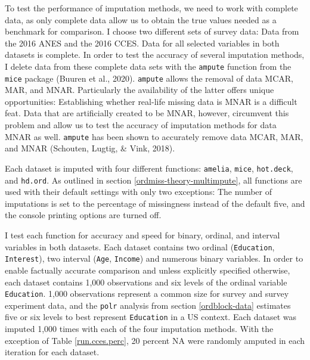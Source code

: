 \documentclass[12pt,econ]{sources/authesis}
\begin{document}
To test the performance of imputation methods, we need to work with complete data, as only complete data allow us to obtain the true values needed as a benchmark for comparison. I choose two different sets of survey data: Data from the 2016 ANES and the 2016 CCES. Data for all selected variables in both datasets is complete. In order to test the accuracy of several imputation methods, I delete data from these complete data sets with the \texttt{ampute} function from the \texttt{mice} package (Buuren et al., 2020). \texttt{ampute} allows the removal of data MCAR, MAR, and MNAR. Particularly the availability of the latter offers unique opportunities: Establishing whether real-life missing data is MNAR is a difficult feat. Data that are artificially created to be MNAR, however, circumvent this problem and allow us to test the accuracy of imputation methods for data MNAR as well. \texttt{ampute} has been shown to accurately remove data MCAR, MAR, and MNAR (Schouten, Lugtig, \& Vink, 2018).

Each dataset is imputed with four different functions: \texttt{amelia}, \texttt{mice}, \texttt{hot.deck}, and \texttt{hd.ord}. As outlined in section \ref{ordmiss-theory-multimpute}, all functions are used with their default settings with only two exceptions: The number of imputations is set to the percentage of missingness instead of the default five, and the console printing options are turned off.

I test each function for accuracy and speed for binary, ordinal, and interval variables in both datasets. Each dataset contains two ordinal (\texttt{Education}, \texttt{Interest}), two interval (\texttt{Age}, \texttt{Income}) and numerous binary variables. In order to enable factually accurate comparison and unless explicitly specified otherwise, each dataset contains 1,000 observations and six levels of the ordinal variable \texttt{Education}. 1,000 observations represent a common size for survey and survey experiment data, and the \texttt{polr} analysis from section \ref{ordblock-data} estimates five or six levels to best represent \texttt{Education} in a US context. Each dataset was imputed 1,000 times with each of the four imputation methods. With the exception of Table \ref{run.cces.perc}, 20 percent NA were randomly amputed in each iteration for each dataset.
\end{document}
